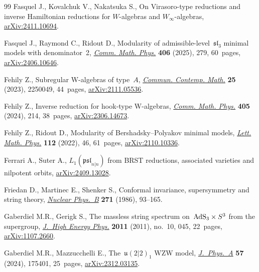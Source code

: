 \documentclass[pdftex]{sigma}
\numberwithin{equation}{section}
\begin{document}
\begin{thebibliography}{99}
Fasquel J., Kovalchuk V., Nakatsuka S., On {Virasoro}-type reductions and
 inverse {H}amiltonian reductions for {$W$}-algebras and
 {$W_{\infty}$}-algebras,
 \href{http://arxiv.org/abs/2411.10694}{arXiv:2411.10694}.

Fasquel J., Raymond C., Ridout D., Modularity of admissible-level~{$\mathfrak
 {sl}_3$} minimal models with denominator~2,
 \href{https://doi.org/10.1007/s00220-025-05447-7}{\textit{Comm. Math. Phys.}}
 \textbf{406} (2025), 279, 60~pages,
 \href{http://arxiv.org/abs/2406.10646}{arXiv:2406.10646}.

Fehily Z., Subregular {W}-algebras of type~{$A$},
 \href{https://doi.org/10.1142/S0219199722500493}{\textit{Commun. Contemp.
 Math.}} \textbf{25} (2023), 2250049, 44~pages,
 \href{http://arxiv.org/abs/2111.05536}{arXiv:2111.05536}.

Fehily Z., Inverse reduction for hook-type {W}-algebras,
 \href{https://doi.org/10.1007/s00220-024-05082-8}{\textit{Comm. Math. Phys.}}
 \textbf{405} (2024), 214, 38~pages,
 \href{http://arxiv.org/abs/2306.14673}{arXiv:2306.14673}.

Fehily Z., Ridout D., Modularity of {B}ershadsky--{P}olyakov minimal models,
 \href{https://doi.org/10.1007/s11005-022-01536-z}{\textit{Lett. Math. Phys.}}
 \textbf{112} (2022), 46, 61~pages,
 \href{http://arxiv.org/abs/2110.10336}{arXiv:2110.10336}.

Ferrari A., Suter A., {$L_1(\mathfrak{psl}_{n\vert n})$} from {BRST}
 reductions, associated varieties and nilpotent orbits,
 \href{http://arxiv.org/abs/2409.13028}{arXiv:2409.13028}.

Friedan D., Martinec E., Shenker S., Conformal invariance, supersymmetry and
 string theory,
 \href{https://doi.org/10.1016/0550-3213(86)90356-1}{\textit{Nuclear Phys.~B}}
 \textbf{271} (1986), 93--165.

Gaberdiel M.R., Gerigk S., The massless string spectrum on~{${\rm AdS}_3\times
 S^3$} from the supergroup,
 \href{https://doi.org/10.1007/jhep10(2011)045}{\textit{J.~High Energy Phys.}}
 \textbf{2011} (2011), no.~10, 045, 22~pages,
 \href{http://arxiv.org/abs/1107.2660}{arXiv:1107.2660}.

Gaberdiel M.R., Mazzucchelli E., The~{$\mathfrak u(2|2)_1$} {WZW} model,
 \href{https://doi.org/10.1088/1751-8121/ad3ab1}{\textit{J.~Phys.~A}}
 \textbf{57} (2024), 175401, 25~pages,
 \href{http://arxiv.org/abs/2312.03135}{arXiv:2312.03135}.


\end{thebibliography}
\end{document}
